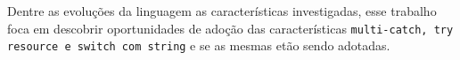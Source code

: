 Dentre as evoluções da linguagem as características investigadas, esse trabalho foca em descobrir oportunidades de adoção das características \texttt{multi-catch, try resource e switch com string} e se as mesmas etão sendo adotadas.
%
%



%



